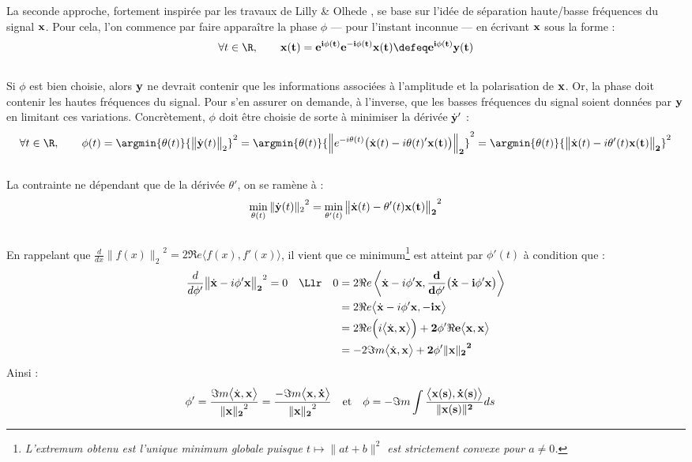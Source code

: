 La seconde approche, fortement inspirée par les travaux de Lilly \& Olhede  \cite{lilly_analysis_2012}, se base sur l'idée de séparation haute/basse fréquences du signal $\bf{x}$. Pour cela, l'on commence par faire apparaître la phase $\phi$ --- pour l'instant inconnue --- en écrivant $\bf{x}$ sous la forme :
\[\forall t\in\R,\qquad \bf{x}(t) = e^{i\phi(t)} e^{-i\phi(t)} \bf{x}(t) \defeq e^{i\phi(t)} \bf{y}(t)\]
\\
Si $\phi$ est bien choisie, alors $\bf{y}$ ne devrait contenir que les informations associées à l'amplitude et la polarisation de $\bf{x}$. Or, la phase doit contenir les hautes fréquences du signal. 
Pour s'en assurer on demande, à l'inverse, que les basses fréquences du signal soient données par $\bf{y}$ en limitant ces variations. Concrètement, $\phi$ doit être choisie de sorte à minimiser la dérivée $\dot{\bf{y}}'$ :
\[\forall t\in\R,\qquad \phi(t) = \argmin{\theta(t)}{\big\|\dot{\bf{y}}(t)\big\|_2}^2 = \argmin{\theta(t)}{\Big\|e^{-i\theta(t)}\big(\dot{\bf{x}}(t) - i\theta(t)'\bf{x}(t)\big)\Big\|_2}^2 = \argmin{\theta(t)}{\big\|\dot{\bf{x}}(t) - i\theta'(t)\bf{x}(t)\big\|_2}^2\]
\\
La contrainte ne dépendant que de la dérivée $\theta'$, on se ramène à :
\[\min_{\theta(t)}{\|\dot{\bf{y}}(t)\|_2}^2 = \min_{\theta'(t)}{\big\|\dot{\bf{x}}(t) - \theta'(t) \bf{x}(t)\big\|_2}^2\]
\\
En rappelant que $\frac{d}{dx}{\big\|f(x)\big\|_2}^2 = 2\Re e\big\langle f(x), f'(x)\big\rangle$, il vient que ce minimum\footnote{\itshape
	L'extremum obtenu est l'unique minimum globale puisque $t\longmapsto \|at + b\|^2$ est strictement convexe pour $a\neq0$.}
est atteint par $\phi'(t)$ à condition que :
\begin{align*}
	\frac{d}{d\phi'}{\big\| \dot{\bf{x}} - i\phi' \bf{x}\big\|_2}^2 = 0 \quad \Llr\quad
	0 &= 2\Re e\left\langle  \dot{\bf{x}} - i\phi' \bf{x} ,  \frac{d}{d\phi'}\big(\dot{\bf{x}} - i\phi' \bf{x}\big)\right\rangle \\
	&= 2\Re e\big\langle  \dot{\bf{x}} - i\phi' \bf{x} ,  - i \bf{x}\big\rangle \\
	&= 2\Re e\Big(i\big\langle  \dot{\bf{x}} ,  \bf{x}\big\rangle\Big) + 2\phi'\Re e\big\langle   \bf{x} ,  \bf{x}\big\rangle\\
	&= -2\Im m\big\langle  \dot{\bf{x}} ,  \bf{x}\big\rangle + 2\phi'{\| \bf{x}\|_2}^2
\end{align*}
Ainsi :
\begin{align}\label{eq:phas_inst_v2}
	\phi' &= \frac{\Im m\big\langle  \dot{\bf{x}} ,  \bf{x}\big\rangle}{{\| \bf{x}\|_2}^2} = \frac{-\Im m\big\langle  \bf{x},  \dot{\bf{x}}\big\rangle}{{\| \bf{x}\|_2}^2}  &  &\text{et}  &  \phi &= -\Im m\int \frac{\big\langle \bf{x}(s) , \dot{\bf{x}}(s) \big\rangle}{\|\bf{x}(s)\|^2} ds
\end{align}
